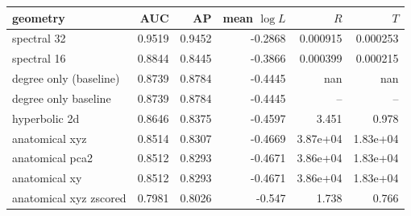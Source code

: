 {\small\setlength{\tabcolsep}{3pt}
\begin{tabular}{l r r r r r}
\toprule
geometry & AUC & AP & mean $\log L$ & $R$ & $T$ \\
\midrule
spectral 32 & 0.9519 & 0.9452 & -0.2868 & 0.000915 & 0.000253 \\
spectral 16 & 0.8844 & 0.8445 & -0.3866 & 0.000399 & 0.000215 \\
degree only (baseline) & 0.8739 & 0.8784 & -0.4445 & nan & nan \\
degree only baseline & 0.8739 & 0.8784 & -0.4445 & -- & -- \\
hyperbolic 2d & 0.8646 & 0.8375 & -0.4597 & 3.451 & 0.978 \\
anatomical xyz & 0.8514 & 0.8307 & -0.4669 & 3.87e+04 & 1.83e+04 \\
anatomical pca2 & 0.8512 & 0.8293 & -0.4671 & 3.86e+04 & 1.83e+04 \\
anatomical xy & 0.8512 & 0.8293 & -0.4671 & 3.86e+04 & 1.83e+04 \\
anatomical xyz zscored & 0.7981 & 0.8026 & -0.547 & 1.738 & 0.766 \\
\bottomrule
\end{tabular}

}

